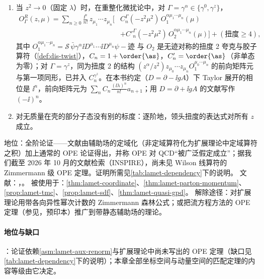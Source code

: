 \begin{assumption}\label{asm:lamet-ope}
\begin{enumerate}[label=(OP\arabic*),leftmargin=3.2em,itemsep=1pt,topsep=2pt]
\item 当 $z^2\to0$（固定 $\lambda$）时，在重整化微扰论中，对 $\Gamma=\gamma^\alpha\in\{\gamma^0,\gamma^z\}$，
\begin{equation}\label{eq:lamet-ope}
\begin{split}
O^R_{\Gamma}(z,\mu)=\sum_{n\ge0}\frac{\ii^n}{n!}\,z_{\mu_1}\cdots z_{\mu_n}\Big[&C^\Gamma_n(-z^2\mu^2)\,O_1^{\alpha\mu_1\cdots\mu_n}(\mu)\\
&+C'^\Gamma_n(-z^2\mu^2)\,O_2^{\alpha\mu_1\cdots\mu_n}(\mu)\Big]+(\text{扭度}\ge4),
\end{split}
\end{equation}
其中 $O_1^{\alpha\mu_1\cdots\mu_n}=\mathcal S\,\bar\psi\gamma^\alpha\ii D^{\mu_1}\cdots\ii D^{\mu_n}\psi-\text{迹}$ 与 $O_2$ 是无迹对称的扭度 2 夸克与胶子算符（\cref{def:dis-twist}），$C_n=1+\order{\as}$，$C'_n=\order{\as}$（非单态为零）；对 $\Gamma=\gamma^z$，同为扭度 2 的结构 $(z^\alpha/z^2)z_{\mu_0}\cdots z_{\mu_n}O_1^{\mu_0\cdots\mu_n}$ 的前向矩阵元与第一项同形，已并入 $C^{\gamma^z}_n$。在本书约定（$D=\partial-\ii gA$）下 Taylor 展开的相位是 $\ii^n$，前向矩阵元为 $\sum_nC_n\frac{(\ii\lambda)^n}{n!}a_{n+1}$；用 $D=\partial+\ii gA$ 的文献写作 $(-\ii)^n$。
\item 对无质量在壳的部分子态没有别的标度：逐阶地，领头扭度的表达式对所有 $z$ 成立。
\end{enumerate}
地位：全阶论证——文献\cite[第~II~节]{IzubuchiEtAl2018}由辅助场的定域化（非定域算符化为扩展理论中定域算符之积）加上通常的 OPE 论证得出，并称 OPE 对 QCD“被广泛假定成立”；据我们截至 2026 年 10 月的文献检索（INSPIRE），尚未见 Wilson 线算符的 Zimmermann 级 OPE 定理。证明所需见\cref{tab:lamet-dependency}下的说明。
文献：\cite[第~II~节]{IzubuchiEtAl2018}，\cite{Radyushkin2017,Braun:2007wv,Ji:2017oey}。
被使用于：\cref{thm:lamet-coordinate}、\cref{thm:lamet-parton-momentum}、\cref{prop:lamet-tmc}、\cref{prop:lamet-sdf}、\cref{thm:lamet-quasi-gpd}。
解除途径：对扩展理论用带各向异性幂次计数的 Zimmermann 森林公式；或把流方程方法的 OPE 定理（参见\cite{Frob:2016mzv}，预印本）推广到带静态辅助场的理论。
\end{assumption}

\paragraph{地位与缺口}
\tagA：论证依赖\cref{asm:lamet-aux-renorm}与扩展理论中尚未写出的 OPE 定理（缺口见\cref{tab:lamet-dependency}下的说明）；本章全部坐标空间与动量空间的匹配定理的内容等级由它决定。

